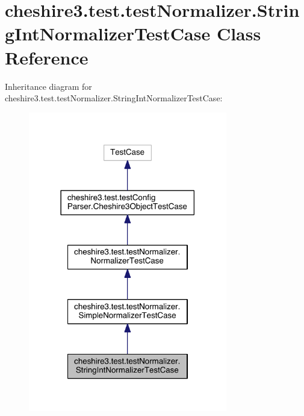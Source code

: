 \hypertarget{classcheshire3_1_1test_1_1test_normalizer_1_1_string_int_normalizer_test_case}{\section{cheshire3.\-test.\-test\-Normalizer.\-String\-Int\-Normalizer\-Test\-Case Class Reference}
\label{classcheshire3_1_1test_1_1test_normalizer_1_1_string_int_normalizer_test_case}
}


Inheritance diagram for cheshire3.\-test.\-test\-Normalizer.\-String\-Int\-Normalizer\-Test\-Case\-:
\nopagebreak
\begin{figure}[H]
\begin{center}
\leavevmode
\includegraphics[width=246pt]{classcheshire3_1_1test_1_1test_normalizer_1_1_string_int_normalizer_test_case__inherit__graph}
\end{center}
\end{figure}


